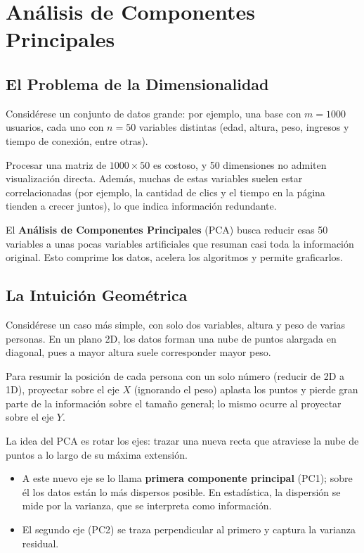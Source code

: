 \documentclass[11pt, a4paper]{article}
\begin{document}
\newpage

\section{Análisis de Componentes Principales}

\subsection{El Problema de la Dimensionalidad}

Considérese un conjunto de datos grande: por ejemplo, una base con $m = 1000$ usuarios, cada uno con $n = 50$ variables distintas (edad, altura, peso, ingresos y tiempo de conexión, entre otras).

Procesar una matriz de $1000 \times 50$ es costoso, y 50 dimensiones no admiten visualización directa. Además, muchas de estas variables suelen estar correlacionadas (por ejemplo, la cantidad de clics y el tiempo en la página tienden a crecer juntos), lo que indica información redundante.

El \textbf{Análisis de Componentes Principales} (PCA) busca reducir esas 50 variables a unas pocas variables artificiales que resuman casi toda la información original. Esto comprime los datos, acelera los algoritmos y permite graficarlos.

\subsection{La Intuición Geométrica}

Considérese un caso más simple, con solo dos variables, altura y peso de varias personas. En un plano 2D, los datos forman una nube de puntos alargada en diagonal, pues a mayor altura suele corresponder mayor peso.

Para resumir la posición de cada persona con un solo número (reducir de 2D a 1D), proyectar sobre el eje $X$ (ignorando el peso) aplasta los puntos y pierde gran parte de la información sobre el tamaño general; lo mismo ocurre al proyectar sobre el eje $Y$.

La idea del PCA es rotar los ejes: trazar una nueva recta que atraviese la nube de puntos a lo largo de su máxima extensión.
\begin{itemize}
    \item A este nuevo eje se lo llama \textbf{primera componente principal} (PC1); sobre él los datos están lo más dispersos posible. En estadística, la dispersión se mide por la varianza, que se interpreta como información.
    \item El segundo eje (PC2) se traza perpendicular al primero y captura la varianza residual.
\end{itemize}
\end{document}
